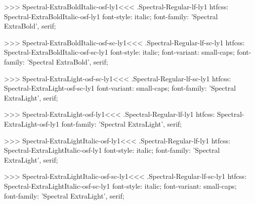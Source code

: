 >>>
\<Spectral-ExtraBoldItalic-osf-ly1\><<<
.Spectral-Regular-lf-ly1
htfcss:  Spectral-ExtraBoldItalic-osf-ly1  font-style: italic; font-family: 'Spectral ExtraBold', serif;

>>>
\<Spectral-ExtraBoldItalic-osf-sc-ly1\><<<
.Spectral-Regular-lf-sc-ly1
htfcss:  Spectral-ExtraBoldItalic-osf-sc-ly1  font-style: italic; font-variant: small-caps; font-family: 'Spectral ExtraBold', serif;

>>>
\<Spectral-ExtraLight-osf-sc-ly1\><<<
.Spectral-Regular-lf-sc-ly1
htfcss:  Spectral-ExtraLight-osf-sc-ly1  font-variant: small-caps; font-family: 'Spectral ExtraLight', serif;

>>>
\<Spectral-ExtraLight-osf-ly1\><<<
.Spectral-Regular-lf-ly1
htfcss:  Spectral-ExtraLight-osf-ly1  font-family: 'Spectral ExtraLight', serif;

>>>
\<Spectral-ExtraLightItalic-osf-ly1\><<<
.Spectral-Regular-lf-ly1
htfcss:  Spectral-ExtraLightItalic-osf-ly1  font-style: italic; font-family: 'Spectral ExtraLight', serif;

>>>
\<Spectral-ExtraLightItalic-osf-sc-ly1\><<<
.Spectral-Regular-lf-sc-ly1
htfcss:  Spectral-ExtraLightItalic-osf-sc-ly1  font-style: italic; font-variant: small-caps; font-family: 'Spectral ExtraLight', serif;

